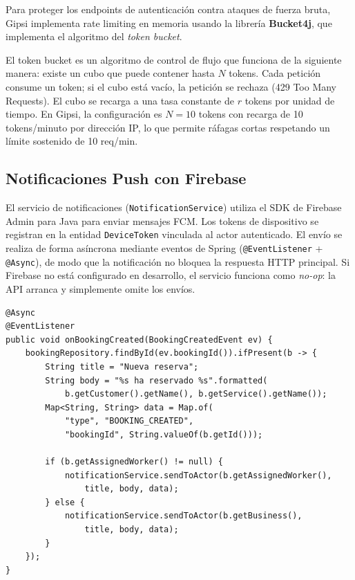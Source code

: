 \documentclass[12pt,a4paper,twoside]{report}
\begin{document}
Para proteger los endpoints de autenticación contra ataques de fuerza bruta, Gipsi implementa rate limiting en memoria usando la librería \textbf{Bucket4j}, que implementa el algoritmo del \textit{token bucket}.

\begin{tcolorbox}[definicionStyle, title={Algoritmo Token Bucket}]
El token bucket es un algoritmo de control de flujo que funciona de la siguiente manera: existe un cubo que puede contener hasta $N$ tokens. Cada petición consume un token; si el cubo está vacío, la petición se rechaza (429 Too Many Requests). El cubo se recarga a una tasa constante de $r$ tokens por unidad de tiempo. En Gipsi, la configuración es $N=10$ tokens con recarga de 10 tokens/minuto por dirección IP, lo que permite ráfagas cortas respetando un límite sostenido de 10 req/min.
\end{tcolorbox}

\subsection{Notificaciones Push con Firebase}

El servicio de notificaciones (\texttt{NotificationService}) utiliza el SDK de Firebase Admin para Java para enviar mensajes FCM. Los tokens de dispositivo se registran en la entidad \texttt{DeviceToken} vinculada al actor autenticado. El envío se realiza de forma asíncrona mediante eventos de Spring (\texttt{@EventListener} + \texttt{@Async}), de modo que la notificación no bloquea la respuesta HTTP principal. Si Firebase no está configurado en desarrollo, el servicio funciona como \textit{no-op}: la API arranca y simplemente omite los envíos.

\begin{lstlisting}[style=javaStyle, caption={Envío asíncrono de notificación push}, label={lst:fcm}]
@Async
@EventListener
public void onBookingCreated(BookingCreatedEvent ev) {
    bookingRepository.findById(ev.bookingId()).ifPresent(b -> {
        String title = "Nueva reserva";
        String body = "%s ha reservado %s".formatted(
            b.getCustomer().getName(), b.getService().getName());
        Map<String, String> data = Map.of(
            "type", "BOOKING_CREATED",
            "bookingId", String.valueOf(b.getId()));

        if (b.getAssignedWorker() != null) {
            notificationService.sendToActor(b.getAssignedWorker(),
                title, body, data);
        } else {
            notificationService.sendToActor(b.getBusiness(),
                title, body, data);
        }
    });
}
\end{lstlisting}
\end{document}
